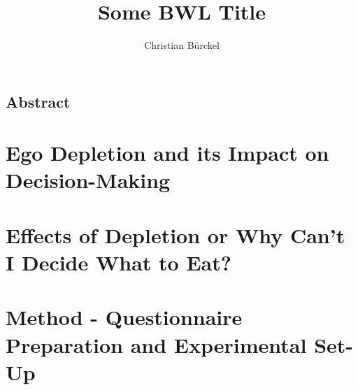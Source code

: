 
\author{Christian Bürckel}
\title{Some BWL Title}




\maketitle
%
 \thispagestyle{plain} %
 \clearpage
 \thispagestyle{empty}
 \mbox{}
 \clearpage
 \pagestyle{bib} %
 \tableofcontents
 \clearpage
 \pagestyle{abstract}
 \section*{Abstract}
  
 \clearpage
 \pagestyle{main}
 \chapter{Ego Depletion and its Impact on Decision-Making}
  
 \chapter{Effects of Depletion or Why Can't I Decide What to Eat?}
  
 \chapter{Method - Questionnaire Preparation and Experimental Set-Up}
 
%
\clearpage
\pagestyle{bib}
%
%

